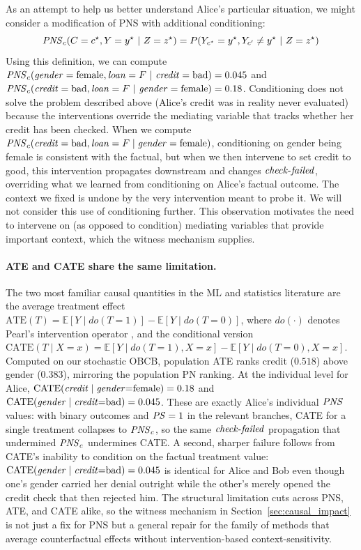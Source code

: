 As an attempt to help us better understand Alice's particular situation, we might consider a modification of PNS with additional conditioning:
\[\mathit{PNS}_{c}(C = c^\star, Y = y^\star ~|~ Z=z^\star) = P(Y_{c^\star} = y^\star, Y_{c'} \neq y^\star ~|~ Z = z^\star)\]
Using this definition, we can compute $\pns_c(\varname{gender} = \text{female}, \varname{loan} = F ~|~ \varname{credit} = \text{bad}) = 0.045$ and $\pns_c(\varname{credit} = \text{bad}, \varname{loan} = F ~|~ \varname{gender} = \text{female}) = 0.18$.
Conditioning does not solve the problem described above (Alice's credit was in reality never evaluated) because the interventions override the mediating variable that tracks whether her credit has been checked.
When we compute $\pns_c(\varname{credit}=\text{bad}, \varname{loan}=F \mid \varname{gender}=\text{female})$, conditioning on gender being female is consistent with the factual, but when we then intervene to set credit to good, this intervention propagates downstream and changes $\varname{check\text{-}failed}$, overriding what we learned from conditioning on Alice's factual outcome.
The context we fixed is undone by the very intervention meant to probe it.
We will not consider this use of conditioning further. This observation motivates the need to intervene on (as
opposed to condition) mediating variables that provide important context, which the witness mechanism supplies.

\paragraph{ATE and CATE share the same limitation.}
The two most familiar causal quantities in the ML and statistics literature are the average treatment effect
$\mathrm{ATE}(T) = \mathbb{E}[Y \mid do(T{=}1)] - \mathbb{E}[Y \mid do(T{=}0)]$, where $do(\cdot)$ denotes
Pearl's intervention operator \citep{causalityPearl},
and the conditional version
$\mathrm{CATE}(T \mid X{=}x) = \mathbb{E}[Y \mid do(T{=}1), X{=}x] - \mathbb{E}[Y \mid do(T{=}0), X{=}x]$.
Computed on our stochastic OBCB, population ATE ranks credit ($0.518$) above gender ($0.383$),
mirroring the population PN ranking.
At the individual level for Alice, $\mathrm{CATE}(\varname{credit}\mid\varname{gender}{=}\text{female}) = 0.18$
and $\mathrm{CATE}(\varname{gender}\mid\varname{credit}{=}\text{bad}) = 0.045$.
These are exactly Alice's individual $\mathit{PNS}$ values: with binary outcomes and $\mathit{PS} = 1$ in the
relevant branches, CATE for a single treatment collapses to $\mathit{PNS}_c$, so the same
$\varname{check\text{-}failed}$ propagation that undermined $\mathit{PNS}_c$ undermines CATE.
A second, sharper failure follows from CATE's inability to condition on the factual
treatment value: $\mathrm{CATE}(\varname{gender}\mid\varname{credit}{=}\text{bad}) = 0.045$ is identical
for Alice and Bob even though one's gender carried her denial outright while the other's
merely opened the credit check that then rejected him.
The structural limitation cuts across PNS, ATE, and CATE alike, so the witness mechanism in Section~\ref{sec:causal_impact} is not
just a fix for PNS but a general repair for the family of methods that average
counterfactual effects without intervention-based context-sensitivity.



